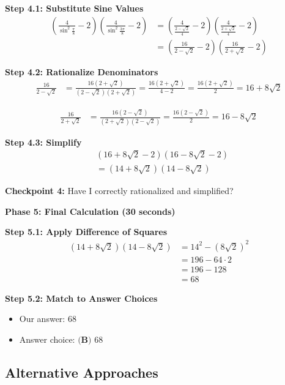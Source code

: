 \documentclass[12pt]{article}
\begin{document}
\begin{solutionbox}
\textbf{Step 4.1: Substitute Sine Values}
\begin{align*}
\left(\frac{4}{\sin^2 \frac{\pi}{8}}-2\right)\left(\frac{4}{\sin^2 \frac{3\pi}{8}}-2\right) &= \left(\frac{4}{\frac{2-\sqrt{2}}{4}}-2\right)\left(\frac{4}{\frac{2+\sqrt{2}}{4}}-2\right) \\
&= \left(\frac{16}{2-\sqrt{2}}-2\right)\left(\frac{16}{2+\sqrt{2}}-2\right)
\end{align*}

\textbf{Step 4.2: Rationalize Denominators}
\begin{align*}
\frac{16}{2-\sqrt{2}} &= \frac{16(2+\sqrt{2})}{(2-\sqrt{2})(2+\sqrt{2})} = \frac{16(2+\sqrt{2})}{4-2} = \frac{16(2+\sqrt{2})}{2} = 16 + 8\sqrt{2}
\end{align*}

\begin{align*}
\frac{16}{2+\sqrt{2}} &= \frac{16(2-\sqrt{2})}{(2+\sqrt{2})(2-\sqrt{2})} = \frac{16(2-\sqrt{2})}{2} = 16 - 8\sqrt{2}
\end{align*}

\textbf{Step 4.3: Simplify}
\begin{align*}
&\left(16 + 8\sqrt{2} - 2\right)\left(16 - 8\sqrt{2} - 2\right) \\
&= \left(14 + 8\sqrt{2}\right)\left(14 - 8\sqrt{2}\right)
\end{align*}

\textbf{Checkpoint 4:} Have I correctly rationalized and simplified?

\textbf{Phase 5: Final Calculation (30 seconds)}

\textbf{Step 5.1: Apply Difference of Squares}
\begin{align*}
\left(14 + 8\sqrt{2}\right)\left(14 - 8\sqrt{2}\right) &= 14^2 - \left(8\sqrt{2}\right)^2 \\
&= 196 - 64 \cdot 2 \\
&= 196 - 128 \\
&= 68
\end{align*}

\textbf{Step 5.2: Match to Answer Choices}
\begin{itemize}
    \item Our answer: 68
    \item Answer choice: $\textbf{(B) } 68$
\end{itemize}

\subsection*{Alternative Approaches}


\end{solutionbox}
\end{document}
